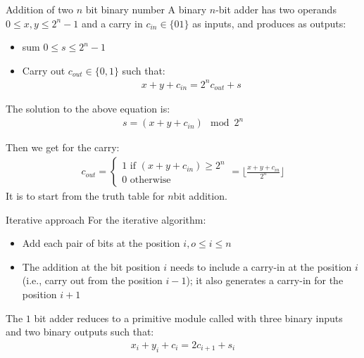 \begin{parag}{Addition of two $n$ bit binary number}
    A binary $n$-bit adder has two operands $0 \leq x, y \leq 2^n - 1$ and a carry in $c_{in} \in \{0 1\}$ as inputs, and produces as outputs:
    \begin{itemize}
        \item sum $0 \leq s \leq 2^n -1$
        \item Carry out $c_{out} \in \{0, 1\}$ such that:
            \begin{align*}
                x +  y + c_{in} = 2^nc_{out} + s
            \end{align*}
    \end{itemize}
    The solution to the above equation is:
    \begin{align*}
        s = (x + y + c_{in}) \mod 2^n
    \end{align*}

    Then we get for the carry:
    \begin{align*}
        c_{out} = \begin{cases}
            1 \text{ if } (x + y + c_{in}) \geq 2^n \\
            0 \text{ otherwise }
        \end{cases}
        = \lfloor  \frac{x + y + c_{in}}{2^n}\rfloor
    \end{align*}
    It is  to start from the truth table for $n$bit addition.
\end{parag}
\begin{parag}{Iterative approach}
    For the iterative algorithm:
    \begin{itemize}
        \item Add each pair of bits at the position $i, o \leq i \leq n$
        \item The addition at the bit position $i$ needs to include a carry-in at the position $i$ (i.e., carry out from the position $i-1$); it also generates a carry-in for the position $i + 1$
    \end{itemize}
    The $1$ bit adder reduces to a primitive module called  with three binary inputs and two binary outputs such that:
    \begin{align*}
        x_i + y_i + c_i = 2c_{i+1} + s_i
    \end{align*}
\end{parag}
